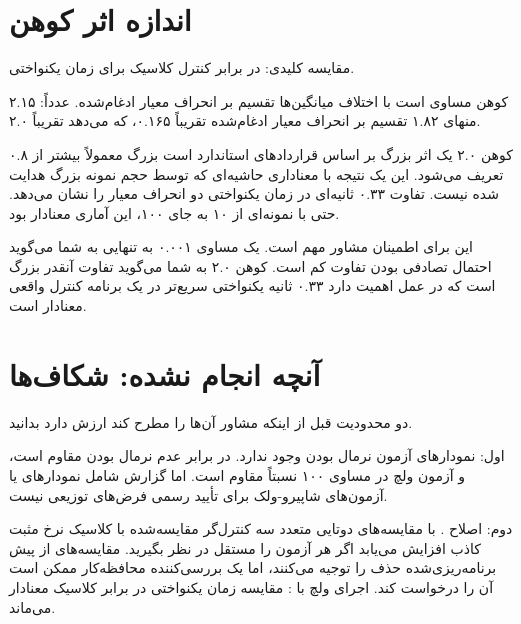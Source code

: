 \documentclass[12pt, a4paper]{article}
\newcommand{\dash}{\lr{---}}
\begin{document}
\section{اندازه اثر  کوهن}

مقايسه کليدی:  در برابر کنترل کلاسيک برای زمان يکنواختی.

 کوهن مساوی است با اختلاف ميانگين‌ها تقسيم بر انحراف معيار ادغام‌شده. عدداً: ۲.۱۵ منهای ۱.۸۲ تقسيم بر انحراف معيار ادغام‌شده تقريباً ۰.۱۶۵، که می‌دهد  تقريباً ۲.۰.

 کوهن ۲.۰ يک اثر بزرگ بر اساس قراردادهای استاندارد است \dash{} بزرگ معمولاً  بيشتر از ۰.۸ تعريف می‌شود. اين يک نتيجه با معناداری حاشيه‌ای که توسط حجم نمونه بزرگ هدايت شده نيست. تفاوت ۰.۳۳ ثانيه‌ای در زمان يکنواختی دو انحراف معيار را نشان می‌دهد. حتی با نمونه‌ای از ۱۰ به جای ۱۰۰، اين آماری معنادار بود.

اين برای اطمينان مشاور مهم است. يک  مساوی ۰.۰۰۱ به تنهايی به شما می‌گويد احتمال تصادفی بودن تفاوت کم است.  کوهن ۲.۰ به شما می‌گويد تفاوت آنقدر بزرگ است که در عمل اهميت دارد \dash{} ۰.۳۳ ثانيه يکنواختی سريع‌تر در يک برنامه کنترل واقعی معنادار است.

\section{آنچه انجام نشده: شکاف‌ها}

دو محدوديت قبل از اينکه مشاور آن‌ها را مطرح کند ارزش دارد بدانيد.

اول: نمودارهای آزمون نرمال بودن وجود ندارد.  در برابر عدم نرمال بودن مقاوم است، و آزمون  ولچ در  مساوی ۱۰۰ نسبتاً مقاوم است. اما گزارش شامل نمودارهای  يا آزمون‌های شاپيرو-ولک برای تأييد رسمی فرض‌های توزيعی نيست.

دوم: اصلاح . با مقايسه‌های دوتايی متعدد \dash{} سه کنترل‌گر مقايسه‌شده با کلاسيک \dash{} نرخ مثبت کاذب افزايش می‌يابد اگر هر آزمون را مستقل در نظر بگيريد. مقايسه‌های از پيش برنامه‌ريزی‌شده حذف را توجيه می‌کنند، اما يک بررسی‌کننده محافظه‌کار ممکن است آن را درخواست کند. اجرای ولچ با : مقايسه زمان يکنواختی  در برابر کلاسيک معنادار می‌ماند.

\end{document}
